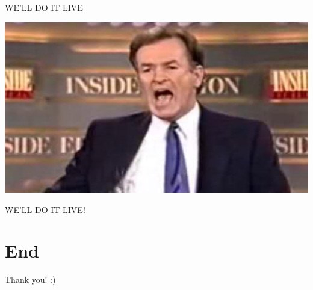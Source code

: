 \documentclass[11pt]{beamer}
\begin{document}
\begin{frame}{WE'LL DO IT LIVE}
\begin{center}
\includegraphics[scale=0.3]{114486a48d800d14f972cb0e74f7b0d9}

WE'LL DO IT LIVE!
\end{center}
\end{frame}

\section{End}

\begin{frame}
\begin{center}
Thank you! :)
\end{center}
\end{frame}
\end{document}

